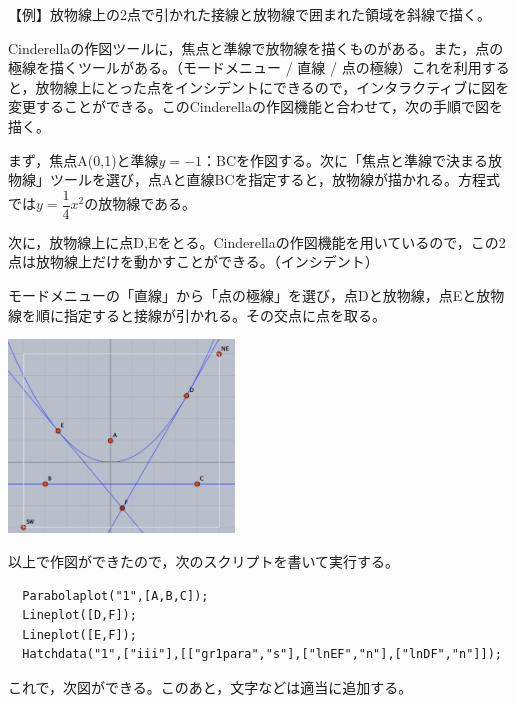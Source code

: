 \documentclass[papersize,a4paper,12pt,uplatex]{jsarticle}
\begin{document}
\begin{description}
\vspace{\baselineskip}
【例】放物線上の2点で引かれた接線と放物線で囲まれた領域を斜線で描く。

Cinderellaの作図ツールに，焦点と準線で放物線を描くものがある。また，点の極線を描くツールがある。（モードメニュー / 直線 / 点の極線）これを利用すると，放物線上にとった点をインシデントにできるので，インタラクティブに図を変更することができる。このCinderellaの作図機能と合わせて，次の手順で図を描く。
  
まず，焦点A(0,1)と準線$y=-1$：BCを作図する。次に「焦点と準線で決まる放物線」ツールを選び，点Aと直線BCを指定すると，放物線が描かれる。方程式では$y=\dfrac{1}{4}x^2$の放物線である。

次に，放物線上に点D,Eをとる。Cinderellaの作図機能を用いているので，この2点は放物線上だけを動かすことができる。（インシデント）

モードメニューの「直線」から「点の極線」を選び，点Dと放物線，点Eと放物線を順に指定すると接線が引かれる。その交点に点を取る。

\vspace{\baselineskip}
\begin{center} \includegraphics[bb=0 0 482.02 413.02 , width=6cm]{Fig/parabolaplot.pdf} \end{center}
            
\vspace{\baselineskip}
  以上で作図ができたので，次のスクリプトを書いて実行する。
\begin{verbatim}
  Parabolaplot("1",[A,B,C]);
  Lineplot([D,F]);
  Lineplot([E,F]);
  Hatchdata("1",["iii"],[["gr1para","s"],["lnEF","n"],["lnDF","n"]]);
\end{verbatim}

これで，次図ができる。このあと，文字などは適当に追加する。
 
\vspace{\baselineskip}
\begin{center} \end{center}


\end{description}
\end{document}
